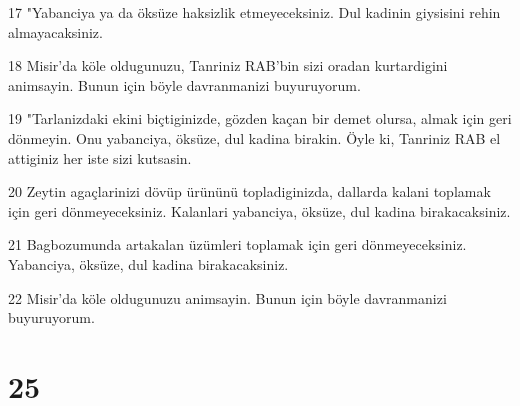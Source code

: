 \par 17 "Yabanciya ya da öksüze haksizlik etmeyeceksiniz. Dul kadinin giysisini rehin almayacaksiniz.
\par 18 Misir'da köle oldugunuzu, Tanriniz RAB'bin sizi oradan kurtardigini animsayin. Bunun için böyle davranmanizi buyuruyorum.
\par 19 "Tarlanizdaki ekini biçtiginizde, gözden kaçan bir demet olursa, almak için geri dönmeyin. Onu yabanciya, öksüze, dul kadina birakin. Öyle ki, Tanriniz RAB el attiginiz her iste sizi kutsasin.
\par 20 Zeytin agaçlarinizi dövüp ürününü topladiginizda, dallarda kalani toplamak için geri dönmeyeceksiniz. Kalanlari yabanciya, öksüze, dul kadina birakacaksiniz.
\par 21 Bagbozumunda artakalan üzümleri toplamak için geri dönmeyeceksiniz. Yabanciya, öksüze, dul kadina birakacaksiniz.
\par 22 Misir'da köle oldugunuzu animsayin. Bunun için böyle davranmanizi buyuruyorum.

\chapter{25}


